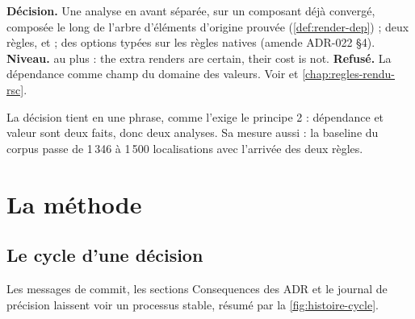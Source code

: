 \begin{decision}
\textbf{Décision.} Une analyse en avant séparée, sur un composant déjà convergé, composée le long de l'arbre d'éléments d'origine prouvée (\cref{def:render-dep}) ; deux règles,  et  ; des options typées sur les règles natives (amende ADR-022 §4). \textbf{Niveau.} \Warning{} au plus : \og the extra renders are certain, their cost is not\fg{}. \textbf{Refusé.} La dépendance comme champ du domaine des valeurs. Voir  et \cref{chap:regles-rendu-rsc}.
\end{decision}

La décision tient en une phrase, comme l'exige le principe 2 : dépendance et valeur sont deux faits, donc deux analyses. Sa mesure aussi : la baseline du corpus passe de 1\,346 à 1\,500 localisations avec l'arrivée des deux règles.

\section{La méthode}
\label{sec:histoire-doctrine-methode}

\subsection{Le cycle d'une décision}

Les messages de commit, les sections \og Consequences\fg{} des ADR et le journal de précision laissent voir un processus stable, résumé par la \cref{fig:histoire-cycle}.

